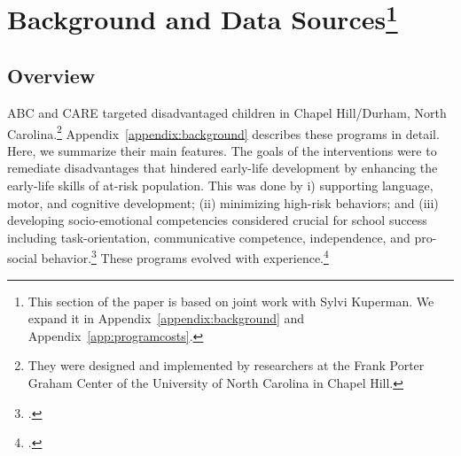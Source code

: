 \section[Background and Data Sources]{Background and Data Sources\footnote{This section of the paper is based on joint work with Sylvi Kuperman. We expand it  in Appendix~\ref{appendix:background} and Appendix~\ref{app:programcosts}.}} \label{section:background}

\subsection{Overview}

ABC and CARE targeted disadvantaged children in Chapel Hill/Durham, North Carolina.\footnote{They were designed and implemented by researchers at the Frank Porter Graham Center of the University of North Carolina in Chapel Hill.} Appendix~\ref{appendix:background} describes these programs in detail. Here, we summarize their main features. The goals of the interventions were to remediate disadvantages that hindered early-life development by enhancing the early-life skills of at-risk population. This was done by i) supporting language, motor, and cognitive development; (ii) minimizing high-risk behaviors; and (iii) developing socio-emotional competencies considered crucial for school success including task-orientation, communicative competence, independence, and pro-social behavior.\footnote{\citet{Ramey_Collier_etal_1976_CarolinaAbecedarianProject, Ramey_etal_1985_Project-CARE_TiECSE, Sparling_1974_Synth_Edu_Infant_SPEECH, Wasik_Ramey_etal_1990_CD, Ramey-etal_2012-ABC}.} These programs evolved with experience.\footnote{ \citet{Ramey-etal_1975_AJoMD, Finkelstein_1982_Day_Care_YC, McGinness_1982_Language-Poverty-Child,Haskins_1985_CD}.}

